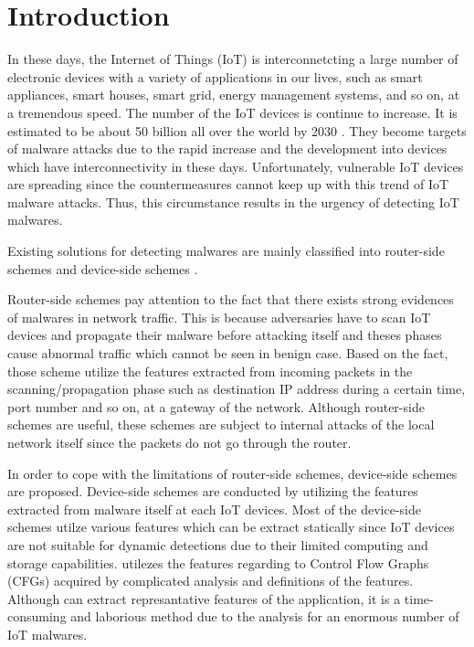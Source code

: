 \chapter{Introduction}\label{Sec:Introduction}

In these days, the Internet of Things (IoT) is interconnetcting a large number of electronic devices with a variety of applications in our lives, such as smart appliances, smart houses, smart grid, energy management systems, and so on, at a tremendous speed.
The number of the IoT devices is continue to increase.
It is estimated to be about 50 billion all over the world by 2030 \cite{}.
They become targets of malware attacks due to the rapid increase and the development into devices which have interconnectivity in these days.
Unfortunately, vulnerable IoT devices are spreading since the countermeasures cannot keep up with this trend of IoT malware attacks.
Thus, this circumstance results in the urgency of detecting IoT malwares.

Existing solutions for detecting malwares are mainly classified into router-side schemes \cite{} and device-side schemes \cite{}.

Router-side schemes pay attention to the fact that there exists strong evidences of malwares in network traffic.
This is because adversaries have to scan IoT devices and propagate their malware before attacking itself and theses phases cause abnormal traffic which cannot be seen in benign case.
Based on the fact, those scheme utilize the features extracted from incoming packets in the scanning/propagation phase such as destination IP address during a certain time, port number and so on, at a gateway of the network.
Although router-side schemes are useful, these schemes are subject to internal attacks of the local network itself since the packets do not go through the router.

In order to cope with the limitations of router-side schemes, device-side schemes are proposed.
Device-side schemes are conducted by utilizing the features extracted from malware itself at each IoT devices.
Most of the device-side schemes utilze various features which can be extract statically since IoT devices are not suitable for dynamic detections due to their limited computing and storage capabilities.
\cite{} utilezes the features regarding to Control Flow Graphs (CFGs) acquired by complicated analysis and definitions of the features.
Although \cite{} can extract represantative features of the application, it is a time-consuming and laborious method due to the analysis for an enormous number of IoT malwares.

